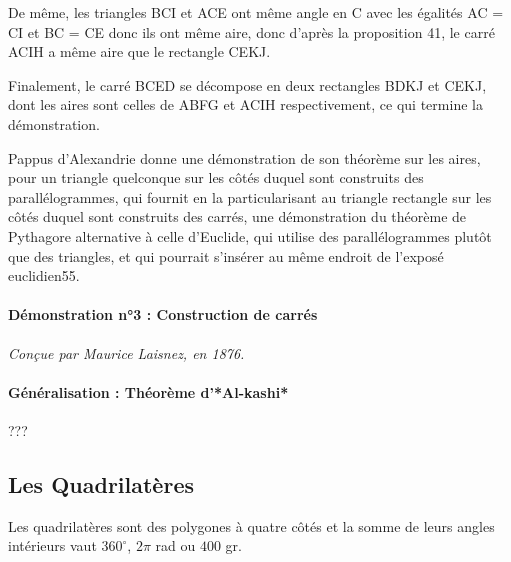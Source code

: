 \documentclass[a4paper, twoside]{article}
\begin{document}
De même, les triangles BCI et ACE ont même angle en C avec les égalités AC = CI et BC = CE donc ils ont même aire, donc d’après la proposition 41, le carré ACIH a même aire que le rectangle CEKJ.

Finalement, le carré BCED se décompose en deux rectangles BDKJ et CEKJ, dont les aires sont celles de ABFG et ACIH respectivement, ce qui termine la démonstration.

Pappus d'Alexandrie donne une démonstration de son théorème sur les aires, pour un triangle quelconque sur les côtés duquel sont construits des parallélogrammes, qui fournit en la particularisant au triangle rectangle sur les côtés duquel sont construits des carrés, une démonstration du théorème de Pythagore alternative à celle d'Euclide, qui utilise des parallélogrammes plutôt que des triangles, et qui pourrait s'insérer au même endroit de l'exposé euclidien55. 

\smallbreak



\paragraph*{Démonstration n°3 : Construction de carrés}

\textit{Conçue par Maurice Laisnez, en 1876.}






\paragraph*{Généralisation : Théorème d'*Al-kashi*}
???


\newpage

\subsection{Les Quadrilatères} \label{quadrilateres}

Les quadrilatères sont des polygones à quatre côtés et la somme de leurs angles
intérieurs vaut $360^\circ$, $2 \pi$ rad ou $400$ gr.
\end{document}
